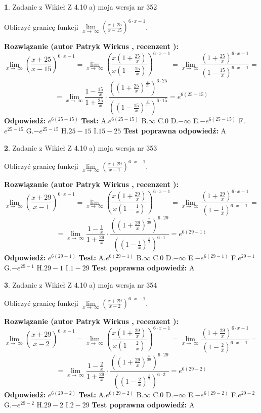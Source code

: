 \documentclass[12pt, a4paper]{article}
\theoremstyle{definition} %
\newtheorem{zad}{}
\newcommand{\zadStart}[1]{\begin{zad}#1\newline}
\newcommand{\zadStop}{\end{zad}}
\newcommand{\rozwStart}[2]{\noindent \textbf{Rozwiązanie (autor #1 , recenzent #2): }\newline}
\newcommand{\rozwStop}{\newline}
\newcommand{\odpStart}{\noindent \textbf{Odpowiedź:}\newline}
\newcommand{\odpStop}{\newline}
\newcommand{\testStart}{\noindent \textbf{Test:}\newline}
\newcommand{\testStop}{\newline}
\newcommand{\kluczStart}{\noindent \textbf{Test poprawna odpowiedź:}\newline}
\newcommand{\kluczStop}{\newline}
\begin{document}
\zadStart{Zadanie z Wikieł Z 4.10 a) moja wersja nr 352}


Obliczyć granicę funkcji  $\lim\limits_{x\to\ \infty}(\frac{x+25}{x-15})^{6\cdot x-1}$.
\zadStop
\rozwStart{Patryk Wirkus}{}
$$\lim\limits_{x\to\ \infty}(\frac{x+25}{x-15})^{6\cdot x-1} = \lim\limits_{x\to\ \infty}(\frac{x(1+\frac{25}{x})}{x(1-\frac{15}{x})})^{6\cdot x-1}=\lim\limits_{x\to\ \infty}\frac{(1+\frac{25}{x})^{6\cdot x-1}}{(1-\frac{15}{x})^{6\cdot x-1}}=$$
$$=\lim\limits_{x\to\ \infty}\frac{1-\frac{15}{x}}{1+\frac{25}{x}}\cdot\frac{((1+\frac{25}{x})^{\frac{x}{25}})^{6\cdot25}}{((1-\frac{15}{x})^{\frac{x}{15}})^{6\cdot15}}=e^{6(25-15)}$$
\rozwStop
\odpStart
$e^{6(25-15)}$
\odpStop
\testStart
A.$e^{6(25-15)}$ B.$\infty$ C.$0$ D.$-\infty$ E.$-e^{6(25-15)}$
F.$e^{25-15}$ G.$-e^{25-15}$
H.$25-15$
I.$15-25$
\testStop
\kluczStart
A
\kluczStop



\zadStart{Zadanie z Wikieł Z 4.10 a) moja wersja nr 353}


Obliczyć granicę funkcji  $\lim\limits_{x\to\ \infty}(\frac{x+29}{x-1})^{6\cdot x-1}$.
\zadStop
\rozwStart{Patryk Wirkus}{}
$$\lim\limits_{x\to\ \infty}(\frac{x+29}{x-1})^{6\cdot x-1} = \lim\limits_{x\to\ \infty}(\frac{x(1+\frac{29}{x})}{x(1-\frac{1}{x})})^{6\cdot x-1}=\lim\limits_{x\to\ \infty}\frac{(1+\frac{29}{x})^{6\cdot x-1}}{(1-\frac{1}{x})^{6\cdot x-1}}=$$
$$=\lim\limits_{x\to\ \infty}\frac{1-\frac{1}{x}}{1+\frac{29}{x}}\cdot\frac{((1+\frac{29}{x})^{\frac{x}{29}})^{6\cdot29}}{((1-\frac{1}{x})^{\frac{x}{1}})^{6\cdot1}}=e^{6(29-1)}$$
\rozwStop
\odpStart
$e^{6(29-1)}$
\odpStop
\testStart
A.$e^{6(29-1)}$ B.$\infty$ C.$0$ D.$-\infty$ E.$-e^{6(29-1)}$
F.$e^{29-1}$ G.$-e^{29-1}$
H.$29-1$
I.$1-29$
\testStop
\kluczStart
A
\kluczStop



\zadStart{Zadanie z Wikieł Z 4.10 a) moja wersja nr 354}


Obliczyć granicę funkcji  $\lim\limits_{x\to\ \infty}(\frac{x+29}{x-2})^{6\cdot x-1}$.
\zadStop
\rozwStart{Patryk Wirkus}{}
$$\lim\limits_{x\to\ \infty}(\frac{x+29}{x-2})^{6\cdot x-1} = \lim\limits_{x\to\ \infty}(\frac{x(1+\frac{29}{x})}{x(1-\frac{2}{x})})^{6\cdot x-1}=\lim\limits_{x\to\ \infty}\frac{(1+\frac{29}{x})^{6\cdot x-1}}{(1-\frac{2}{x})^{6\cdot x-1}}=$$
$$=\lim\limits_{x\to\ \infty}\frac{1-\frac{2}{x}}{1+\frac{29}{x}}\cdot\frac{((1+\frac{29}{x})^{\frac{x}{29}})^{6\cdot29}}{((1-\frac{2}{x})^{\frac{x}{2}})^{6\cdot2}}=e^{6(29-2)}$$
\rozwStop
\odpStart
$e^{6(29-2)}$
\odpStop
\testStart
A.$e^{6(29-2)}$ B.$\infty$ C.$0$ D.$-\infty$ E.$-e^{6(29-2)}$
F.$e^{29-2}$ G.$-e^{29-2}$
H.$29-2$
I.$2-29$
\testStop
\kluczStart
A
\kluczStop
\end{document}
